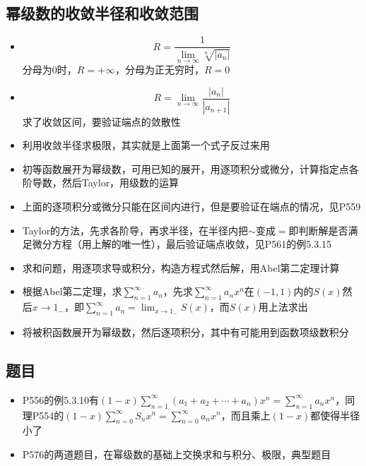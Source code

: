 \documentclass[UTF8]{ctexart}
\begin{document}
\subsection{幂级数的收敛半径和收敛范围}
\begin{itemize}
\item
\[
R=\frac{1}{\lim_{n \to \infty}\sqrt[n]{|a_n|}}
\]
分母为0时，$R=+\infty$，分母为正无穷时，$R=0$
\item
\[
R=\lim_{n\to \infty}\frac{|a_n|}{|a_{n+1}|}
\]
求了收敛区间，要验证端点的敛散性
\item 利用收敛半径求极限，其实就是上面第一个式子反过来用

\item 初等函数展开为幂级数，可用已知的展开，用逐项积分或微分，计算指定点各阶导数，然后Taylor，用级数的运算

\item 上面的逐项积分或微分只能在区间内进行，但是要验证在端点的情况，见P559

\item Taylor的方法，先求各阶导，再求半径，在半径内把$\sim$变成$=$即判断解是否满足微分方程（用上解的唯一性），最后验证端点收敛，见P561的例5.3.15

\item 求和问题，用逐项求导或积分，构造方程式然后解，用Abel第二定理计算

\item 根据Abel第二定理，求$\sum_{n=1}^\infty a_n$，先求$\sum_{n=1}^\infty a_nx^n$在$(-1,1)$内的$S(x)$然后$x\to 1_-$，即$\sum_{n=1}^\infty a_n=\lim_{x\to 1_-}S(x)$，而$S(x)$用上法求出

\item 将被积函数展开为幂级数，然后逐项积分，其中有可能用到函数项级数积分

\end{itemize}

\subsection{题目}
\begin{itemize}
\item P556的例5.3.10有$(1-x)\sum_{n=1}^\infty(a_1+a_2+\cdots+a_n)x^n=\sum_{n=1}^\infty a_nx^n$，同理P554的$(1-x)\sum_{n=0}^\infty S_nx^n=\sum_{n=0}^\infty a_nx^n$，而且乘上$(1-x)$都使得半径小了

\item P576的两道题目，在幂级数的基础上交换求和与积分、极限，典型题目
\end{itemize}
\end{document}
